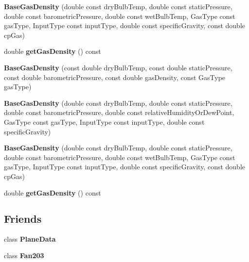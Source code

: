 \begin{DoxyCompactItemize}
\item 
\mbox{\label{class_base_gas_density_a08fc6e441bfec806ea73a9e37be60d92}} 
{\bfseries Base\+Gas\+Density} (double const dry\+Bulb\+Temp, double const static\+Pressure, double const barometric\+Pressure, double const wet\+Bulb\+Temp, Gas\+Type const gas\+Type, Input\+Type const input\+Type, double const specific\+Gravity, const double cp\+Gas)
\item 
\mbox{\label{class_base_gas_density_a1cbf2591aecb384afd5843f0e4a62a4e}} 
double {\bfseries get\+Gas\+Density} () const
\item 
\mbox{\label{class_base_gas_density_a84089ddd9d29649d83a7b150b711b989}} 
{\bfseries Base\+Gas\+Density} (const double dry\+Bulb\+Temp, const double static\+Pressure, const double barometric\+Pressure, const double gas\+Density, const Gas\+Type gas\+Type)
\item 
\mbox{\label{class_base_gas_density_a0d53c40eecc4aad87c8fef1cfed1b614}} 
{\bfseries Base\+Gas\+Density} (double const dry\+Bulb\+Temp, double const static\+Pressure, double const barometric\+Pressure, double const relative\+Humidity\+Or\+Dew\+Point, Gas\+Type const gas\+Type, Input\+Type const input\+Type, double const specific\+Gravity)
\item 
\mbox{\label{class_base_gas_density_a08fc6e441bfec806ea73a9e37be60d92}} 
{\bfseries Base\+Gas\+Density} (double const dry\+Bulb\+Temp, double const static\+Pressure, double const barometric\+Pressure, double const wet\+Bulb\+Temp, Gas\+Type const gas\+Type, Input\+Type const input\+Type, double const specific\+Gravity, const double cp\+Gas)
\item 
\mbox{\label{class_base_gas_density_a1cbf2591aecb384afd5843f0e4a62a4e}} 
double {\bfseries get\+Gas\+Density} () const
\end{DoxyCompactItemize}
\subsection*{Friends}
\begin{DoxyCompactItemize}
\item 
\mbox{\label{class_base_gas_density_a31f6bbdce0894df6a817f493afffda84}} 
class {\bfseries Plane\+Data}
\item 
\mbox{\label{class_base_gas_density_ad537df0087a4a6f474dc9d50579cc33d}} 
class {\bfseries Fan203}
\end{DoxyCompactItemize}


